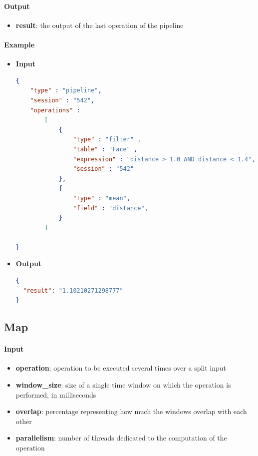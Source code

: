 \documentclass[a4paper,notitlepage,onecolumn]{hitec}  %
\begin{document}
\paragraph{Output}
\begin{itemize}
\item\textbf{result}: the output of the last operation of the pipeline
\end{itemize}

\paragraph{Example}
\begin{itemize}
\item\textbf{Input}
\begin{lstlisting}[language=json,firstnumber=1]
{
    "type" : "pipeline",
    "session" : "542",
    "operations" : 
        [
            {
                "type" : "filter" ,
                "table" : "Face" ,
                "expression" : "distance > 1.0 AND distance < 1.4",
                "session" : "542"
            },
            {
                "type" : "mean",
                "field" : "distance",
            }
        ]
    
}
\end{lstlisting}
\item\textbf{Output}
\begin{lstlisting}[language=json,firstnumber=1]
{
  "result": "1.10210271298777"
}
\end{lstlisting}
\end{itemize}

\subsection{Map}

\paragraph{Input}
\begin{itemize}
\item\textbf{operation}: operation to be executed several times over a split input
\item\textbf{window\_size}: size of a single time window on which the operation is performed, in milliseconds
\item\textbf{overlap}: percentage representing how much the windows overlap with each other
\item\textbf{parallelism}: number of threads dedicated to the computation of the operation
\end{itemize}
\end{document}
